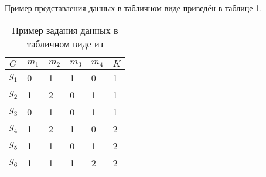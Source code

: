 	Пример представления данных в табличном виде приведён в таблице \ref{tab:ToyCompare-Peskov}.

	\begin{table} [htbp]%
		\centering
		\caption{Пример задания данных в табличном виде из \cite{Peskov2004}}%
		\label{tab:ToyCompare-Peskov}		\begin{SingleSpace}
			\begin{tabular}{|l|l|l|l|l|l|}
				\hline
				$G$&$m_1$&$m_2$&$m_3$&$m_4$&$K$\\
				\hline
				$g_1$&0&1&1&0&1\\
				$g_2$&1&2&0&1&1\\
				$g_3$&0&1&0&1&1\\
				$g_4$&1&2&1&0&2\\
				$g_5$&1&1&0&1&2\\
				$g_6$&1&1&1&2&2\\
				\hline
			\end{tabular}
		\end{SingleSpace}
	\end{table}
